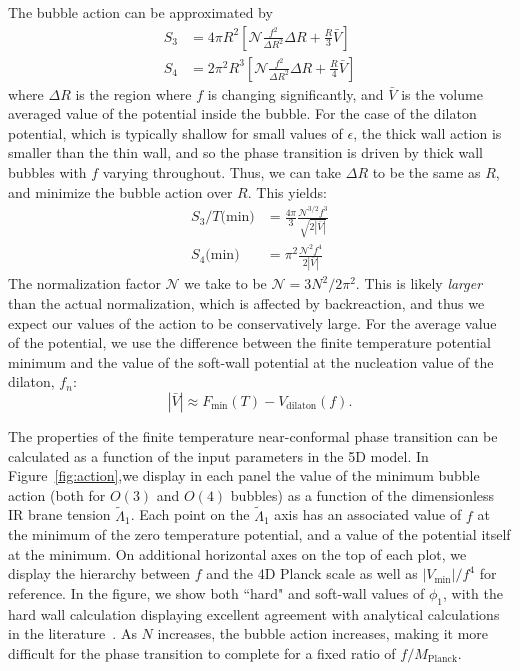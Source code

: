 \documentclass[12pt]{article}
\renewcommand{\tilde}{\widetilde} %
\begin{document}
The bubble action can be approximated by~\cite{Anderson:1991zb}
\begin{align}
S_{3} &= 4 \pi R^{2} \left[ {\mathcal N} \frac{f^2}{\Delta R^2} \Delta R + \frac{R}{3} \bar{V} \right] \nonumber \\
S_4 & = 2 \pi^2 R^3  \left[ {\mathcal N} \frac{f^2}{\Delta R^2} \Delta R + \frac{R}{4} \bar{V} \right] 
\end{align}
where $\Delta R$ is the region where $f$ is changing significantly, and  $\bar{V}$ is the volume averaged value of the potential inside the bubble.  
For the case of the dilaton potential, which is typically shallow for small values of $\epsilon$, the thick wall action is smaller than the thin wall, and so the phase transition is driven by thick wall bubbles with $f$ varying throughout.  Thus, we can take $\Delta R$ to be the same as $R$, and minimize the bubble action over $R$.  This yields:
\begin{align}
S_3/T \text{(min)} &= \frac{4 \pi}{3} \frac{ {\mathcal N}^{3/2} f^3}{\sqrt{2 |\bar{V}|}} \nonumber \\
S_4 \text{(min)} &= \pi^2 \frac{ {\mathcal N}^2 f^4 }{2 | \bar{V} |}
\end{align}
The normalization factor $\mathcal N$ we take to be $\mathcal N = 3 N^2/2 \pi^2$.  This is likely \emph{larger} than the actual normalization, which is affected by backreaction, and thus we expect our values of the action to be conservatively large.  For the average value of the potential, we use the difference between the finite temperature potential minimum and the value of the soft-wall potential at the nucleation value of the dilaton, $f_n$:
\begin{equation}
|\bar{V}| \approx F_\text{min} (T) - V_\text{dilaton} (f).
\end{equation} 

The properties of the finite temperature near-conformal phase transition can be calculated as a function of the input parameters in the 5D model.  In Figure~\ref{fig:action},we display in each panel the value of the minimum bubble action (both for $O(3)$ and $O(4)$ bubbles) as a function of the dimensionless IR brane tension $\tilde{\Lambda}_1$.  Each point on the $\tilde{\Lambda}_1$ axis has an associated value of $f$ at the minimum of the zero temperature potential, and a value of the potential itself at the minimum.  On additional horizontal axes on the top of each plot, we display the hierarchy between $f$ and the 4D Planck scale as well as $| V_\text{min}| /f^4$ for reference.  In the figure, we show both ``hard" and soft-wall values of $\phi_1$, with the hard wall calculation displaying excellent agreement with analytical calculations in the literature~\cite{Randall:2006py}.  As $N$ increases, the bubble action increases, making it more difficult for the phase transition to complete for a fixed ratio of $f/M_\text{Planck}$.
\end{document}
